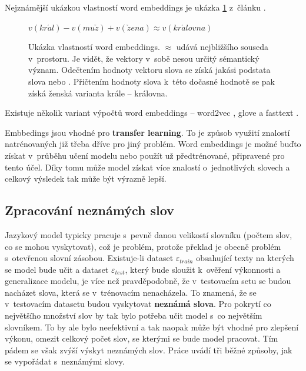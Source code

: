 Nejznámější ukázkou vlastností word embeddings je ukázka \ref{figure:kingQueen} z~článku \cite{kingQueen}.


\begin{figure}[H]
    \begin{center}
        $
          v(kr\acute{a}l) - v(mu\check{z}) + v(\check{z}ena) \approx v(kr\acute{a}lovna)
        $
    \end{center}
	\caption{Ukázka vlastností word embeddings. $\approx$ udává nejbližšího souseda v~prostoru. Je vidět, že vektory v~sobě nesou určitý sémantický význam. Odečtením hodnoty vektoru slova  se získá jakási podstata slova  nebo . Přičtením hodnoty slova  k~této dočasné hodnotě se pak získá ženská varianta krále -- královna.}
	\label{figure:kingQueen}
\end{figure}


Existuje několik variant výpočtů word embeddings -- word2vec \cite{word2vec}, glove \cite{glove} a fasttext \cite{fasttext}.


Embbedings jsou vhodné pro \textbf{transfer learning}. To je způsob využití znalostí natrénovaných již třeba dříve pro jiný problém. Word embeddings je možné buďto získat v~průběhu učení modelu nebo použít už předtrénované, připravené pro tento účel. Díky tomu může model získat více znalostí o~jednotlivých slovech a celkový výsledek tak může být výrazně lepší.

\subsection{Zpracování neznámých slov} \label{subsection:oov}
Jazykový model typicky pracuje s~pevně danou velikostí slovníku (počtem slov, co se mohou vyskytovat), což je problém, protože překlad je obecně problém s~otevřenou slovní zásobou. Existuje-li dataset $\varepsilon_{train}$ obsahující texty na kterých se model bude učit a dataset $\varepsilon_{test}$, který bude sloužit k~ověření výkonnosti a generalizace modelu, je více než pravděpodobně, že v~testovacím setu se budou nacházet slova, která se v~trénovacím nenacházela. To znamená, že se v~testovacím datasetu budou vyskytovat \textbf{neznámá slova}. Pro pokrytí co největšího množství slov by tak bylo potřeba učit model s~co největším slovníkem. To by ale bylo neefektivní a tak naopak může být vhodné pro zlepšení výkonu, omezit celkový počet slov, se kterými se bude model pracovat. Tím pádem se však zvýší výskyt neznámých slov. Práce \cite{nmtTutorial} uvádí tři běžné způsoby, jak se vypořádat s~neznámými slovy.

